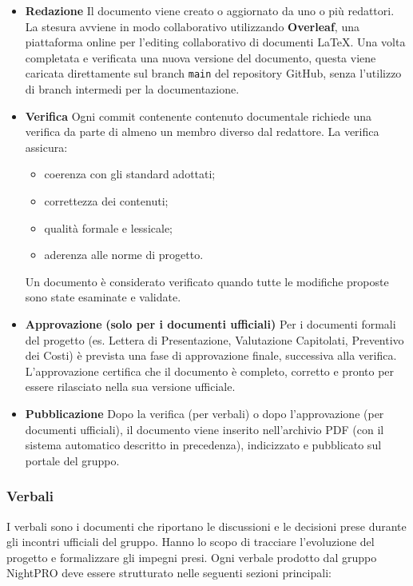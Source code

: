 \documentclass[a4paper, 11pt, oneside]{scrartcl} %
\begin{document}
\begin{itemize}
    \item \textbf{Redazione}{\scriptsize{}}  
    Il documento viene creato o aggiornato da uno o più redattori.
    La stesura avviene in modo collaborativo utilizzando \textbf{Overleaf}{\scriptsize{}}, una piattaforma online per l'editing collaborativo di documenti \LaTeX{}. Una volta completata e verificata una nuova versione del documento, questa viene caricata direttamente sul branch \texttt{main} del repository GitHub, senza l'utilizzo di branch intermedi per la documentazione.
\item \textbf{Verifica}{\scriptsize{}}  
    Ogni commit contenente contenuto documentale richiede una verifica da parte di almeno un membro diverso dal redattore.
    La verifica assicura:
    \begin{itemize}
        \item coerenza con gli standard adottati;
\item correttezza dei contenuti;
        \item qualità formale e lessicale;
        \item aderenza alle norme di progetto.
\end{itemize}
    Un documento è considerato verificato quando tutte le modifiche proposte sono state esaminate e validate.
\item \textbf{Approvazione}{\scriptsize{}} \textbf{(solo per i documenti ufficiali) }Per i documenti formali del progetto (es. Lettera di Presentazione, Valutazione Capitolati, Preventivo dei Costi) è prevista una fase di approvazione finale, successiva alla verifica.
    L'approvazione certifica che il documento è completo, corretto e pronto per essere rilasciato nella sua versione ufficiale.
\item \textbf{Pubblicazione}{\scriptsize{}}  
    Dopo la verifica (per verbali) o dopo l'approvazione (per documenti ufficiali), il documento viene inserito nell'archivio PDF (con il sistema automatico descritto in precedenza), indicizzato e pubblicato sul portale del gruppo.
\end{itemize}

\subsubsection{Verbali}
I verbali{\scriptsize{}} sono i documenti che riportano le discussioni e le decisioni prese durante gli incontri ufficiali del gruppo.
Hanno lo scopo di tracciare l'evoluzione del progetto e formalizzare gli impegni presi.
Ogni verbale prodotto dal gruppo NightPRO deve essere strutturato nelle seguenti sezioni principali:
\end{document}
